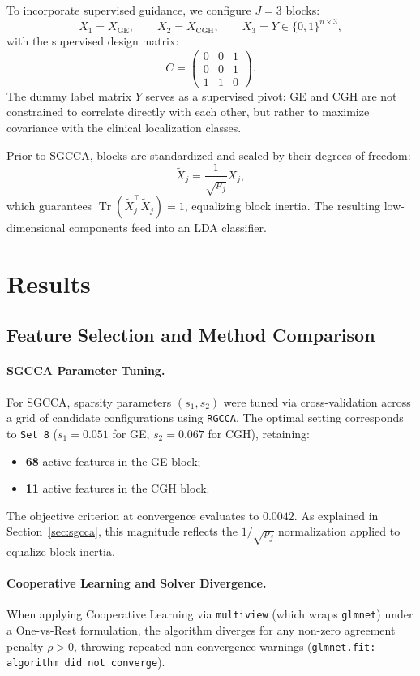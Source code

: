 \documentclass[a4paper,11pt]{paper}
\theoremstyle{plain}
\theoremstyle{definition}
\theoremstyle{remark}
\begin{document}
To incorporate supervised guidance, we configure $J = 3$ blocks:
$$X_1 = X_{\text{GE}}, \qquad X_2 = X_{\text{CGH}}, \qquad X_3 = Y \in \{0, 1\}^{n \times 3},$$
with the supervised design matrix:
$$
    C = \begin{pmatrix} 0 & 0 & 1 \\ 0 & 0 & 1 \\ 1 & 1 & 0 \end{pmatrix}.
$$
The dummy label matrix $Y$ serves as a supervised pivot: GE and CGH are not constrained to correlate directly with each other, but rather to maximize covariance with the clinical localization classes.

Prior to SGCCA, blocks are standardized and scaled by their degrees of freedom:
$$\tilde X_j = \frac{1}{\sqrt{p_j}} X_j,$$
which guarantees $\operatorname{Tr}(\tilde X_j^\top \tilde X_j) = 1$, equalizing block inertia. The resulting low-dimensional components feed into an LDA classifier.

\newpage


\section{Results}
\label{sec:resultats}

\subsection{Feature Selection and Method Comparison}

\paragraph{SGCCA Parameter Tuning.}
For SGCCA, sparsity parameters $(s_1, s_2)$ were tuned via cross-validation across a grid of candidate configurations using \texttt{RGCCA}. The optimal setting corresponds to \texttt{Set 8} ($s_1 = 0.051$ for GE, $s_2 = 0.067$ for CGH), retaining:
\begin{itemize}
    \item \textbf{68} active features in the GE block;
    \item \textbf{11} active features in the CGH block.
\end{itemize}
The objective criterion at convergence evaluates to $0.0042$. As explained in Section~\ref{sec:sgcca}, this magnitude reflects the $1/\sqrt{p_j}$ normalization applied to equalize block inertia.

\paragraph{Cooperative Learning and Solver Divergence.}
When applying Cooperative Learning via \texttt{multiview} (which wraps \texttt{glmnet}) under a One-vs-Rest formulation, the algorithm diverges for any non-zero agreement penalty $\rho > 0$, throwing repeated non-convergence warnings (\texttt{glmnet.fit: algorithm did not converge}).
\end{document}
